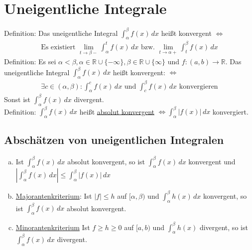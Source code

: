 \section{Uneigentliche Integrale}
Definition: Das uneigentliche Integral $\int_\alpha^\beta f(x)\,dx$ heißt konvergent $\Leftrightarrow$ 
\begin{align*}
    \text{Es existiert } \lim \limits_{t \to \beta -} \int_\alpha^t f(x)\,dx
    \text{ bzw. }
    \lim \limits_{t \to \alpha +} \int_t^\beta f(x)\,dx
\end{align*}
Definition: Es sei $\alpha < \beta, \alpha \in \mathbb{R} \cup \{-\infty\}, \beta \in \mathbb{R} \cup \{\infty\}$ und 
$f:(a,b) \to \mathbb{R}$. Das uneigentliche Integral $\int_\alpha^\beta f(x)\,dx$ heißt konvergent: $\Leftrightarrow$
\begin{align*}
    \exists c \in (\alpha, \beta): \int_\alpha^c f(x)\,dx \text{ und } \int_c^\beta f(x)\,dx \text{ konvergieren}
\end{align*}
Sonst ist $\int_\alpha^\beta f(x)\,dx$ divergent. \\
Definition: $\int_\alpha^\beta f(x)\,dx$ heißt \underline{absolut konvergent} $\Leftrightarrow \int_\alpha^\beta |f(x)|\,dx$ konvergiert.

\subsection{Abschätzen von uneigentlichen Integralen}
\begin{enumerate} [a)]
    \item Ist $\int_\alpha^\beta f(x)\,dx$ absolut konvergent, so ist $\int_\alpha^\beta f(x)\,dx$ konvergent und 
    $|\int_\alpha^\beta f(x)\,dx| \leq \int_\alpha^\beta |f(x)|\,dx$
    \item \underline{Majorantenkriterium}: Ist $|f| \leq h$ auf $[\alpha,\beta)$ und $\int_\alpha^\beta h(x)\,dx$ konvergent, so ist
    $\int_\alpha^\beta f(x)\,dx$ absolut konvergent.
    \item \underline{Minorantenkriterium} Ist $f\geq h \geq 0$ auf $[a,b)$ und $\int_\alpha^\beta h(x)$ divergent, so ist 
    $\int_\alpha^\beta f(x)\,dx$ divergent.
\end{enumerate}